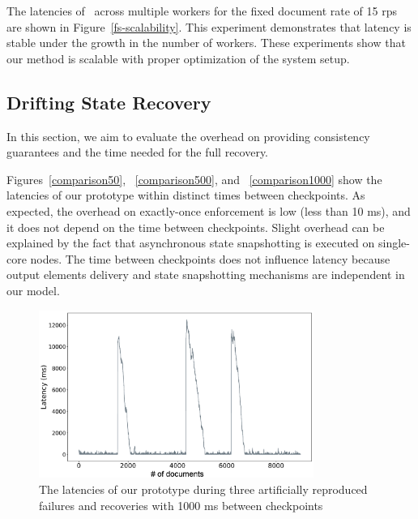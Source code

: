 
The latencies of \FlameStream\ across multiple workers for the fixed document rate of 15 rps are shown in Figure~\ref{fs-scalability}. This experiment demonstrates that latency is stable  under  the growth in the number of workers. These experiments show that our method is scalable with proper  optimization of  the system setup.

\subsection{Drifting State Recovery}
In this section, we aim to evaluate the overhead on providing consistency guarantees and the time needed for the full recovery.

Figures~\ref{comparison50}, ~\ref{comparison500}, and ~\ref{comparison1000} show the latencies of our prototype within distinct times between checkpoints. As expected, the overhead on exactly-once enforcement is low (less than 10 ms), and it does not depend on the time between checkpoints. Slight overhead can be explained by the fact that asynchronous state snapshotting is executed on single-core nodes. The time between checkpoints does not influence latency because output elements delivery and state snapshotting mechanisms are independent in our model.

\begin{figure}[t]
  \centering
  \includegraphics[width=0.8\textwidth]{Chapters/DeterministicModelRuntime/pics/blink-2}
  \caption{The latencies of our prototype during three artificially reproduced failures and recoveries with 1000 ms between checkpoints}
  \label {recovery}
\end{figure}


